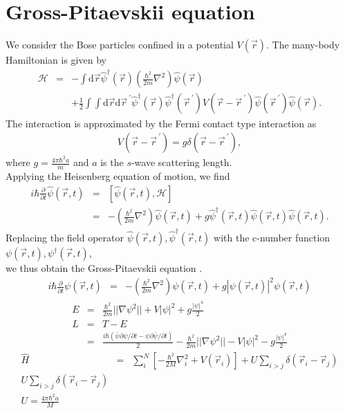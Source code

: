 \documentclass[12pt,a4paper]{report}
\newcommand{\diff}{\mathrm{d}}				            %
\begin{document}
\section{Gross-Pitaevskii equation}
We consider the Bose particles confined in a potential $V(\vec{r})$.
The many-body Hamiltonian is given by
\begin{eqnarray}
\mathcal{H} & = & - \int \diff \vec{r} \hat{\psi}^\dagger (\vec{r}) \left (\frac{\hbar^2}{2m} \nabla^2 \right)
\hat{\psi}(\vec{r}) \nonumber
\\
& & + \frac{1}{2} \int \int \diff \vec{r} \diff \vec{r}^{\ \prime} \hat{\psi}^\dagger( \vec{r} ) \hat{\psi}^\dagger( \vec{r}^{\ \prime} )
V (\vec{r} - \vec{r}^{\ \prime} ) \hat{\psi}( \vec{r}^{\ \prime} ) \hat{\psi}( \vec{r} ).
\end{eqnarray}
The interaction is approximated by the Fermi contact type interaction as
\begin{eqnarray}
V (\vec{r} - \vec{r}^{\ \prime} ) = g \delta (\vec{r} - \vec{r}^{\ \prime}),
\end{eqnarray}
where  $g = \frac{4 \pi \hbar^2 a}{m}$
and $a$ is the $s$-wave scattering length.
\\
Applying the Heisenberg equation of motion, we find
\begin{eqnarray}
i \hbar \frac{\partial}{\partial t} \hat{\psi} ( \vec{r}, t ) & = & \left[ \hat{\psi} ( \vec{r}, t ), \mathcal{H} \right] \nonumber
\\
& = & - \left( \frac{\hbar^2}{2m} \nabla^2 \right) \hat{\psi} ( \vec{r}, t )
+ g \hat{\psi}^\dagger (\vec{r}, t) \hat{\psi}( \vec{r}, t) \hat{\psi}( \vec{r}, t ).
\end{eqnarray}
Replacing the field operator $\hat{\psi}(\vec{r},t),\hat{\psi}^\dagger(\vec{r},t)$ with the c-number function
$\psi(\vec{r},t),\psi^\dagger(\vec{r},t)$,
\\
we thus obtain the Gross-Pitaevskii equation \cite{17}.
\begin{eqnarray}
i \hbar \frac{\partial}{\partial t} \psi ( \vec{r}, t ) & = & 
- \left( \frac{\hbar^2}{2m} \nabla^2 \right) \psi( \vec{r}, t)
+ g | \psi(\vec{r}, t) |^2 \psi( \vec{r}, t )
\end{eqnarray}
\begin{eqnarray}
E & = & \frac{\hbar^2}{2m} ||\nabla \psi^2|| + V |\psi|^2 + g \frac{|\psi|^4}{2}
\\
L & = & T - E
\\
& = & \frac{i \hbar (\bar{\psi}\partial \psi/\partial t - \psi \partial \bar{\psi} / \partial t)}{2}
- \frac{\hbar^2}{2m} ||\nabla \psi^2|| - V |\psi|^2 - g \frac{|\psi|^4}{2}
\end{eqnarray}
\begin{eqnarray}
\hat{H} & = & \sum_i^N \left[ - \frac{\hbar^2}{2M} \nabla_i^2 + V (\vec{r}_i) \right] + U \sum_{i>j}
\delta(\vec{r}_i - \vec{r}_j)
\\
U \sum_{i>j} \delta(\vec{r}_i - \vec{r}_j)
\\
U = \frac{4 \pi \hbar^2 a}{M}
\end{eqnarray}
\fi
\end{document}

